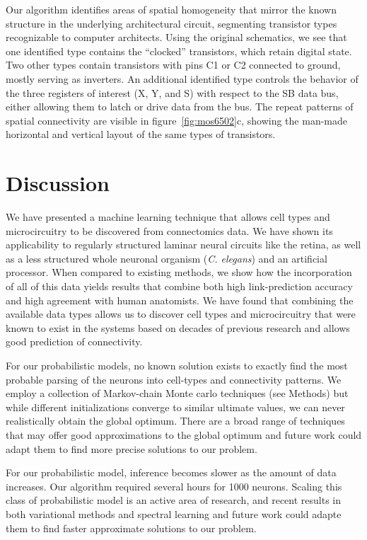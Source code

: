 \documentclass{article}
\begin{document}
Our algorithm identifies areas of spatial homogeneity that mirror the
known structure in the underlying architectural circuit, segmenting
transistor types recognizable to computer architects. Using the
original schematics, we see that one identified type contains the
``clocked'' transistors, which retain digital state. Two other types
contain transistors with pins C1 or C2 connected to ground, mostly
serving as inverters.  An additional identified type controls the
behavior of the three registers of interest (X, Y, and S) with respect
to the SB data bus, either allowing them to latch or drive data from
the bus. The repeat patterns of spatial connectivity are visible in
figure~\ref{fig:mos6502}c, showing the man-made horizontal and
vertical layout of the same types of transistors.

\section*{Discussion}
We have presented a machine learning technique that allows cell types
and microcircuitry to be discovered from connectomics data.  We have
shown its applicability to regularly structured laminar neural circuits like the retina, 
as well as a less structured whole neuronal organism (\textit{C. elegans}) and an artificial processor. When compared to existing methods, we show how the
incorporation of all of this data yields results that combine both
high link-prediction accuracy and high agreement with human
anatomists. We have found that combining the
available data types allows us to discover cell types and
microcircuitry that were known to exist in the systems based on
decades of previous research and allows good prediction of
connectivity.

For our probabilistic models, no known solution exists to
exactly find the most probable parsing of the neurons into cell-types
and connectivity patterns. We employ a collection of Markov-chain
Monte carlo techniques (see Methods) but while different
initializations converge to similar ultimate values, we can never
realistically obtain the global optimum. There are a broad range of
techniques that may offer good approximations to the global optimum
and future work could adapt them to
find more precise solutions to our problem.

For our probabilistic model, inference becomes slower as the amount of
data increases. Our algorithm required several hours for 1000
neurons. Scaling this class of probabilistic model is an active area
of research, and recent results in both variational methods
\autocite{Hoffman2013} and spectral learning \autocite{Anandkumar2012}
and future work could adapte them to find faster approximate solutions
to our problem.
\end{document}
